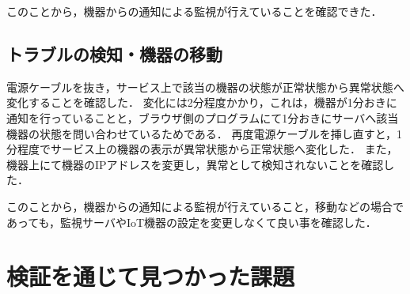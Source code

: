 このことから，機器からの通知による監視が行えていることを確認できた．
\subsection{トラブルの検知・機器の移動}
電源ケーブルを抜き，サービス上で該当の機器の状態が正常状態から異常状態へ変化することを確認した．
変化には2分程度かかり，これは，機器が1分おきに通知を行っていることと，ブラウザ側のプログラムにて1分おきにサーバへ該当機器の状態を問い合わせているためである．
再度電源ケーブルを挿し直すと，1分程度でサービス上の機器の表示が異常状態から正常状態へ変化した．
また，機器上にて機器のIPアドレスを変更し，異常として検知されないことを確認した．

このことから，機器からの通知による監視が行えていること，移動などの場合であっても，監視サーバやIoT機器の設定を変更しなくて良い事を確認した．

\section{検証を通じて見つかった課題}


